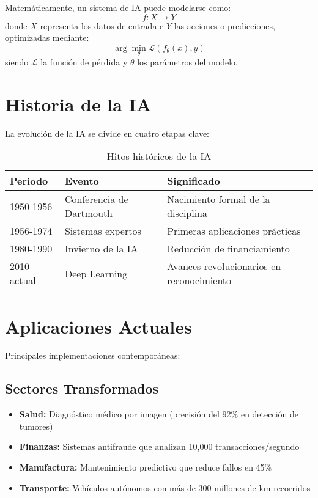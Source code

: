\documentclass[12pt,a4paper]{article}
\begin{document}
Matemáticamente, un sistema de IA puede modelarse como:
\begin{equation}
f: X \rightarrow Y
\end{equation}
donde \(X\) representa los datos de entrada e \(Y\) las acciones o predicciones, optimizadas mediante:
\begin{equation}
\arg\min_{\theta} \mathcal{L}(f_\theta(x), y)
\end{equation}
siendo \(\mathcal{L}\) la función de pérdida y \(\theta\) los parámetros del modelo.

\section{Historia de la IA}
La evolución de la IA se divide en cuatro etapas clave:

\begin{table}[H]
\centering
\caption{Hitos históricos de la IA}
\label{tab:historia}
\begin{tabular}{@{}lll@{}}
\toprule
\textbf{Periodo} & \textbf{Evento} & \textbf{Significado} \\
\midrule
1950-1956 & Conferencia de Dartmouth & Nacimiento formal de la disciplina \\
1956-1974 & Sistemas expertos & Primeras aplicaciones prácticas \\
1980-1990 & Invierno de la IA & Reducción de financiamiento \\
2010-actual & Deep Learning & Avances revolucionarios en reconocimiento \\
\bottomrule
\end{tabular}
\end{table}

\section{Aplicaciones Actuales}
Principales implementaciones contemporáneas:

\subsection*{Sectores Transformados}
\begin{itemize}
\item \textbf{Salud:} Diagnóstico médico por imagen (precisión del 92\% en detección de tumores)
\item \textbf{Finanzas:} Sistemas antifraude que analizan 10,000 transacciones/segundo
\item \textbf{Manufactura:} Mantenimiento predictivo que reduce fallos en 45\%
\item \textbf{Transporte:} Vehículos autónomos con más de 300 millones de km recorridos
\end{itemize}
\end{document}

